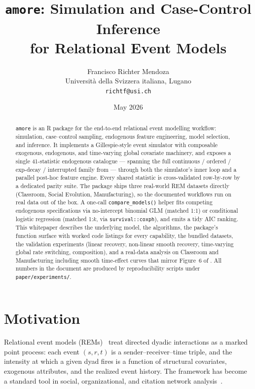 \documentclass[11pt,a4paper]{article}
\title{\textbf{\texttt{amore}: Simulation and Case-Control Inference \\
       for Relational Event Models}}
\author{Francisco Richter Mendoza\\
        \small Universit\`a della Svizzera italiana, Lugano \\
        \small \texttt{richtf@usi.ch}}
\date{May 2026}
\begin{document}
\maketitle
\tableofcontents
\bigskip

\begin{abstract}
\noindent
\texttt{amore} is an R package for the end-to-end relational
event modelling workflow: simulation, case--control sampling,
endogenous feature engineering, model selection, and inference.
It implements a Gillespie-style event simulator with composable
exogenous, endogenous, and time-varying global covariate machinery,
and exposes a single 41-statistic endogenous catalogue --- spanning
the full continuous / ordered / exp-decay / interrupted family
from \citet{juozaitiene2024about} --- through both the simulator's
inner loop and a parallel post-hoc feature engine. Every shared
statistic is cross-validated row-by-row by a dedicated parity
suite. The package ships three real-world REM datasets directly
(Classroom, Social Evolution, Manufacturing), so the documented
workflows run on real data out of the box. A one-call
\texttt{compare\_models()} helper fits competing endogenous
specifications via no-intercept binomial GLM (matched 1:1) or
conditional logistic regression (matched 1:$k$, via
\texttt{survival::coxph}), and emits a tidy AIC ranking. This
whitepaper describes the underlying model, the algorithms, the
package's function surface with worked code listings for every
capability, the bundled datasets, the validation experiments
(linear recovery, non-linear smooth recovery, time-varying global
rate switching, composition), and a real-data analysis on
Classroom and Manufacturing including smooth time-effect curves
that mirror Figure~6 of \citet{juozaitiene2024about}. All numbers
in the document are produced by reproducibility scripts under
\texttt{paper/experiments/}.
\end{abstract}

\section{Motivation}

Relational event models (REMs)~\citep{butts2008relational,perry2013point}
treat directed dyadic interactions as a marked point process: each
event $(s, r, t)$ is a sender--receiver--time triple, and the
intensity at which a given dyad fires is a function of structural
covariates, exogenous attributes, and the realized event history.
The framework has become a standard tool in social, organizational,
and citation network analysis~\citep{vu2017relational,stadtfeld2017dynamic}.
\end{document}
